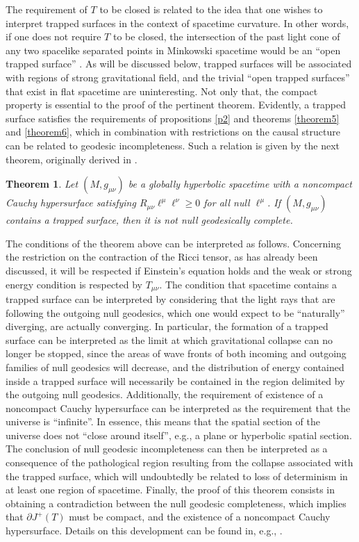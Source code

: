 \documentclass[
12pt,		%
openright,	%
twoside,  %
a4paper,			%
chapter=TITLE,		%
english,			%
french,				%
spanish,			%
brazil				%
]{USPSC-classe/USPSC}
\newtheorem{theorem}{Theorem}[section]
\begin{document}
The requirement of $T$ to be closed is related to the idea that one wishes to interpret trapped surfaces in the context of spacetime curvature. In other words, if one does not require $T$ to be closed, the intersection of the past light cone of any two spacelike separated points in Minkowski spacetime would be an ``open trapped surface” \cite{Frolov1998}. As will be discussed below, trapped surfaces will be associated with regions of strong gravitational field, and the trivial ``open trapped surfaces” that exist in flat spacetime are uninteresting. Not only that, the compact property is essential to the proof of the pertinent theorem. Evidently, a trapped surface satisfies the requirements of propositions \ref{p2} and theorems \ref{theorem5} and \ref{theorem6}, which in combination with restrictions on the causal structure can be related to geodesic incompleteness. Such a relation is given by the next theorem, originally derived in \cite{Penrose1965}. 
\begin{theorem}\label{HawPen}
    Let $(M,g_{\mu\nu})$ be a globally hyperbolic spacetime with a noncompact Cauchy hypersurface satisfying $R_{\mu\nu}\ell^{\mu}\ell^{\nu}\geq 0$ for all  null $\ell^{\mu}$. If $(M,g_{\mu\nu})$ contains a trapped surface, then it is not null geodesically complete.
\end{theorem}

The conditions of the theorem above can be interpreted as follows. Concerning the restriction on the contraction of the Ricci tensor, as has already been discussed, it will be respected if Einstein's equation holds and the weak or strong energy condition is respected by $T_{\mu\nu}$. The condition that spacetime contains a trapped surface can be interpreted by considering that the light rays that are following the outgoing null geodesics, which one would expect to be ``naturally'' diverging, are actually converging. In particular, the formation of a trapped surface can be interpreted as the limit at which gravitational collapse can no longer be stopped, since the areas of wave fronts of both incoming and outgoing families of null geodesics will decrease, and the distribution of energy contained inside a trapped surface will necessarily be contained in the region delimited by the outgoing null geodesics. Additionally, the requirement of existence of a noncompact Cauchy hypersurface can be interpreted as the requirement that the universe is ``infinite''. In essence, this means that the spatial section of the universe does not ``close around itself'', e.g., a plane or hyperbolic spatial section. The conclusion of null geodesic incompleteness can then be interpreted as a consequence of the pathological region resulting from the collapse associated with the trapped surface, which will undoubtedly be related to loss of determinism in at least one region of spacetime. Finally, the proof of this theorem consists in obtaining a contradiction between the null geodesic completeness, which implies that $\partial J^+(T)$ must be compact, and the existence of a noncompact Cauchy hypersurface. Details on this development can be found in, e.g., \cite{Wald1984}. 
\end{document}
